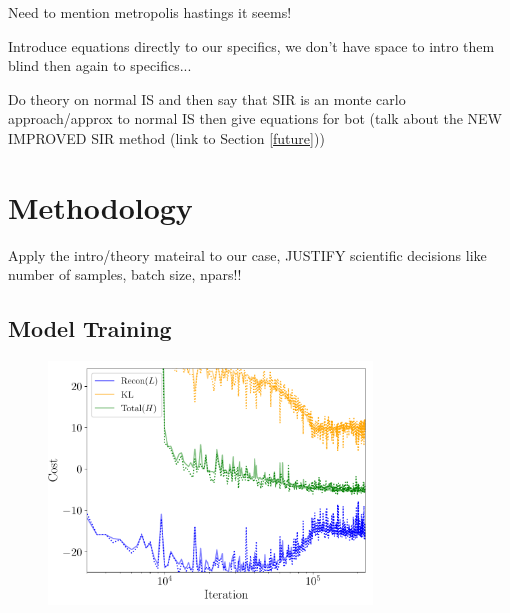 \documentclass[aps,superscriptaddress,twocolumn,nopreprintnumbers,floatfix,groupedaddress]{revtex4-1}
\newcommand{\figwidth}{8.6cm}
\begin{document}

Need to mention metropolis hastings it seems!

Introduce equations directly to our specifics, we don't have space to intro them blind then again to specifics...



Do theory on normal IS and then say that SIR is an monte carlo approach/approx to normal IS then give equations for bot (talk about the NEW IMPROVED SIR method (link to Section \ref{future}))

%

\section{Methodology}\label{methods}

Apply the intro/theory mateiral to our case, JUSTIFY scientific decisions like number of samples, batch size, npars!!

\subsection{Model Training}

\begin{figure}
	\centering
	\includegraphics[width=\figwidth]{figs/cost.pdf}
	\caption{}
	\label{fig:learning_contours}
\end{figure}
\end{document}
